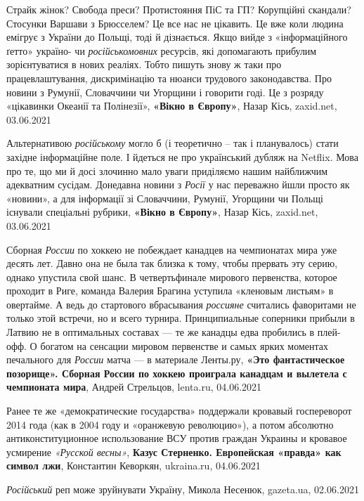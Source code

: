 Страйк жінок? Свобода преси? Протистояння ПіС та ГП? Корупційні скандали?
Стосунки Варшави з Брюсселем? Це все нас не цікавить. Це вже коли людина
емігрує з України до Польщі, тоді й дізнається. Якщо вийде з «інформаційного
ґетто» україно- чи \emph{російськомовних} ресурсів, які допомагають прибулим
зорієнтуватися в нових реаліях. Тобто пишуть знову ж таки про працевлаштування,
дискримінацію та нюанси трудового законодавства. Про новини з Румунії,
Словаччини чи Угорщини і говорити годі. Це з розряду «цікавинки Океанії та
Полінезії»,
\textbf{«Вікно в Європу»}, Назар Кісь, zaxid.net, 03.06.2021

Альтернативою \emph{російському} могло б (і теоретично – так і планувалось) стати
західне інформаційне поле. І йдеться не про український дубляж на Netflix. Мова
про те, що ми й досі злочинно мало уваги приділяємо нашим найближчим адекватним
сусідам. Донедавна новини з \emph{Росії} у нас переважно йшли просто як «новини», а
для інформації зі Словаччини, Румунії, Угорщини чи Польщі існували спеціальні
рубрики,
\textbf{«Вікно в Європу»}, Назар Кісь, zaxid.net, 03.06.2021

Сборная \emph{России} по хоккею не побеждает канадцев на чемпионатах мира уже
десять лет. Давно она не была так близка к тому, чтобы прервать эту серию,
однако упустила свой шанс. В четвертьфинале мирового первенства, которое
проходит в Риге, команда Валерия Брагина уступила «кленовым листьям» в
овертайме. А ведь до стартового вбрасывания \emph{россияне} считались
фаворитами не только этой встречи, но и всего турнира. Принципиальные соперники
прибыли в Латвию не в оптимальных составах — те же канадцы едва пробились в
плей-офф. О богатом на сенсации мировом первенстве и самых ярких моментах
печального для \emph{России} матча — в материале Ленты.ру,
\textbf{«Это фантастическое позорище». Сборная России по хоккею проиграла канадцам и вылетела с чемпионата мира},
Андрей Стрельцов, lenta.ru, 04.06.2021

Ранее те же «демократические государства» поддержали кровавый госпереворот 2014
года (как в 2004 году и «оранжевую революцию»), а потом абсолютно
антиконституционное использование ВСУ против граждан Украины и кровавое
усмирение \emph{«Русской весны»},
\textbf{Казус Стерненко. Европейская «правда» как символ лжи}, 
Константин Кеворкян, ukraina.ru, 04.06.2021

\emph{Російський} реп може зруйнувати Україну,
Микола Несенюк, gazeta.ua, 02.06.2021

